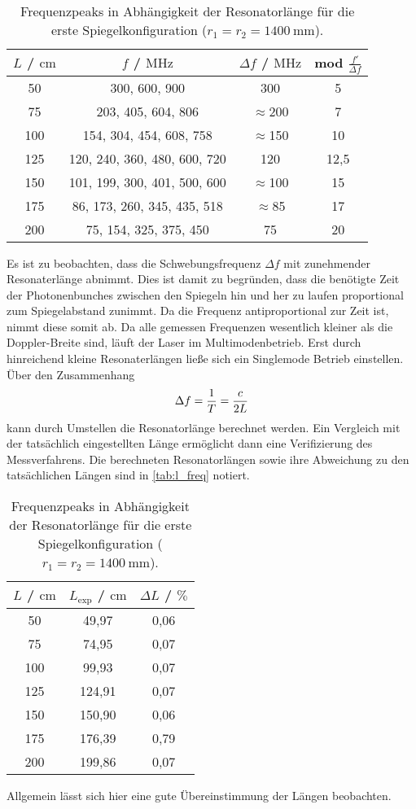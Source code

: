 \begin{table}[H]
  \centering
  \begin{tabular}{c|c|c|c}
    {$L$ / $\unit{\centi\metre}$} & {$f$ / $\unit{\mega\hertz}$} & {$\Delta f$ / $\unit{\mega\hertz}$} & {mod $\frac{f'}{\Delta f}$} \\
    \hline
    50  &  300, 600, 900 & 300 & 5\\
    75  &  203, 405, 604, 806 & $\approx$200 & 7 \\
    100  & 154, 304, 454, 608, 758 & $\approx$150 & 10 \\
    125  & 120, 240, 360, 480, 600, 720 & 120 & 12,5 \\
    150  & 101, 199, 300, 401, 500, 600 & $\approx$100 & 15 \\
    175  & 86, 173, 260, 345, 435, 518 & $\approx$85 & 17\\
    200  & 75, 154, 325, 375, 450 & 75 & 20
  \end{tabular}
  \caption{Frequenzpeaks in Abhängigkeit der Resonatorlänge für die erste Spiegelkonfiguration ($r_1=r_2=\qty{1400}{\milli\metre}$).}
  \label{tab:frequenz}
\end{table}
Es ist zu beobachten, dass die Schwebungsfrequenz $\Delta f$ mit zunehmender Resonaterlänge abnimmt. Dies ist damit zu begründen,
dass die benötigte Zeit der Photonenbunches zwischen den Spiegeln hin und her zu laufen proportional zum Spiegelabstand zunimmt.
Da die Frequenz antiproportional zur Zeit ist, nimmt diese somit ab.
Da alle gemessen Frequenzen wesentlich kleiner als die Doppler-Breite sind, läuft der Laser im Multimodenbetrieb. Erst durch hinreichend
kleine Resonaterlängen ließe sich ein Singlemode Betrieb einstellen.
Über den Zusammenhang
\begin{equation}
  \notag
  \Delta f = \frac{1}{T} = \frac{c}{2L}
\end{equation}
kann durch Umstellen die Resonatorlänge berechnet werden. Ein Vergleich mit der tatsächlich eingestellten Länge
ermöglicht dann eine Verifizierung des Messverfahrens.
Die berechneten Resonatorlängen sowie ihre Abweichung zu den tatsächlichen Längen sind in \autoref{tab:l_freq}
notiert.
\begin{table}[H]
  \centering
  \begin{tabular}{c|c|c}
    {$L$ / $\unit{\centi\metre}$} & {$L_{\text{exp}}$ / $\unit{\centi\metre}$} & {$\Delta L$ / $\unit{\percent}$} \\
    \hline
    50  &  49,97 & 0,06\\
    75  &  74,95 & 0,07 \\
    100  & 99,93 & 0,07  \\
    125  & 124,91 & 0,07  \\
    150  & 150,90 & 0,06 \\
    175  & 176,39 & 0,79 \\
    200  & 199,86 & 0,07
  \end{tabular}
  \caption{Frequenzpeaks in Abhängigkeit der Resonatorlänge für die erste Spiegelkonfiguration ($r_1=r_2=\qty{1400}{\milli\metre}$).}
  \label{tab:l_freq}
\end{table}
Allgemein lässt sich hier eine gute Übereinstimmung der Längen beobachten.

